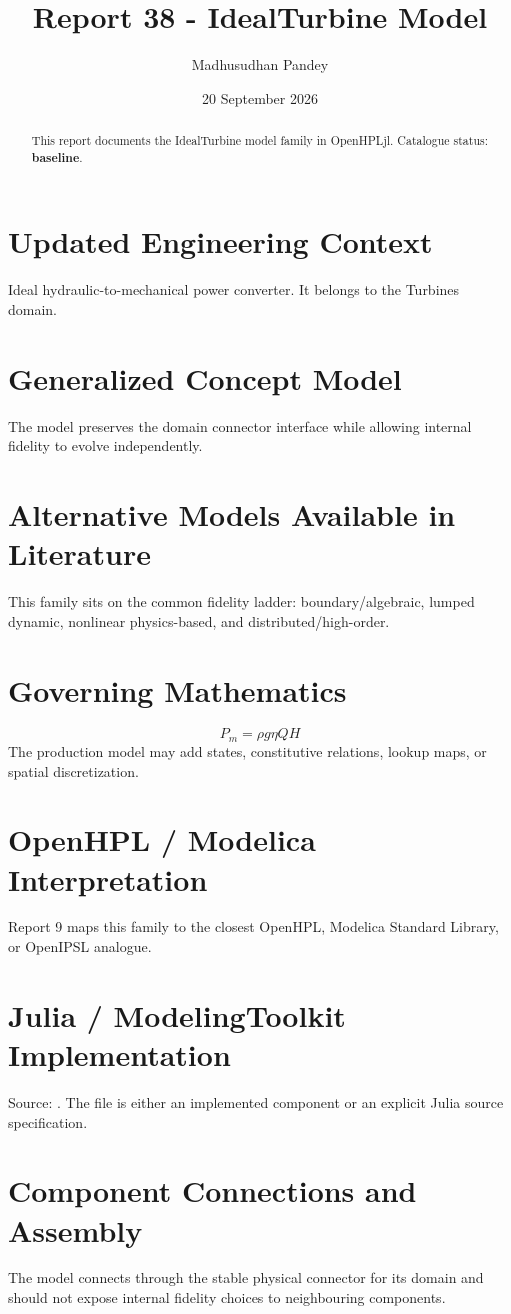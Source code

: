\documentclass[10pt,a4paper]{article}
\title{Report 38 - IdealTurbine Model}
\author{Madhusudhan Pandey}
\date{20 September 2026}
\begin{document}
\maketitle
\begin{abstract}This report documents the IdealTurbine model family in OpenHPLjl. Catalogue status: \textbf{baseline}.\end{abstract}
\section{Updated Engineering Context}Ideal hydraulic-to-mechanical power converter. It belongs to the Turbines domain.
\section{Generalized Concept Model}The model preserves the domain connector interface while allowing internal fidelity to evolve independently.
\section{Alternative Models Available in Literature}This family sits on the common fidelity ladder: boundary/algebraic, lumped dynamic, nonlinear physics-based, and distributed/high-order.
\section{Governing Mathematics}\[P_m=\rho g\eta QH\]The production model may add states, constitutive relations, lookup maps, or spatial discretization.
\section{OpenHPL / Modelica Interpretation}Report 9 maps this family to the closest OpenHPL, Modelica Standard Library, or OpenIPSL analogue.
\section{Julia / ModelingToolkit Implementation}Source: \texttt{}. The file is either an implemented component or an explicit Julia source specification.
\section{Component Connections and Assembly}The model connects through the stable physical connector for its domain and should not expose internal fidelity choices to neighbouring components.
\end{document}
